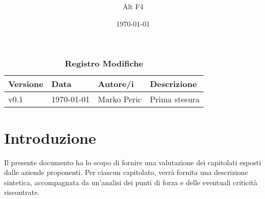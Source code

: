 \documentclass[a4paper, 12pt]{article}
\title{\Huge \textbf{\titolo}}
\author{\Large{Alt} \raisebox{0.3ex}{\normalsize  +} \Large{F4}}
\date{\today}
\def\logo{../Immagini/logo.jpeg}
\def\ultima-versione{v0.1}
\begin{document}
\begin{titlepage}      
    \maketitle
    \thispagestyle{empty}  

\end{titlepage}

\tableofcontents

\newpage

\begin{table}[!h]
    \centering
    \caption*{\textbf{\Large Registro Modifiche}}
    {\renewcommand{\arraystretch}{2}
    \begin{tabularx}{\textwidth}{| X | X | X | X |}
        \hline
            \textbf{\large Versione} & 
            \textbf{\large Data} & 
            \textbf{\large Autore/i} & 
            \textbf{\large Descrizione} \\ 
        \hline \hline
            \ultima-versione & 
            \today & 
            Marko Peric & 
            Prima stesura \\
        \hline 
    \end{tabularx}}
\end{table}

\section{Introduzione}
Il presente documento ha lo scopo di fornire una valutazione dei capitolati esposti dalle aziende proponenti.
Per ciascun capitolato, verrà fornita una descrizione sintetica, accompagnata da un’analisi dei punti di forza e delle eventuali criticità riscontrate.
\end{document}
